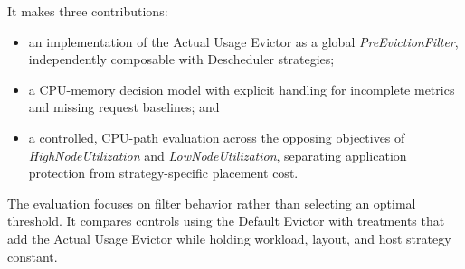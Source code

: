 It makes three contributions:

\begin{itemize}
    \item an implementation of the Actual Usage Evictor as a global
    \textit{PreEvictionFilter}, independently composable with Descheduler
    strategies;
    \item a CPU-memory decision model with explicit handling for incomplete
    metrics and missing request baselines; and
    \item a controlled, CPU-path evaluation across the opposing objectives of
    \textit{HighNodeUtilization} and \textit{LowNodeUtilization}, separating
    application protection from strategy-specific placement cost.
\end{itemize}

The evaluation focuses on filter behavior rather than selecting an optimal
threshold. It compares controls using the Default Evictor with treatments that
add the Actual Usage Evictor while holding workload, layout, and host strategy
constant.
